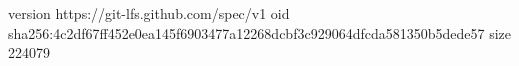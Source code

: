 version https://git-lfs.github.com/spec/v1
oid sha256:4c2df67ff452e0ea145f6903477a12268dcbf3c929064dfcda581350b5dede57
size 224079
